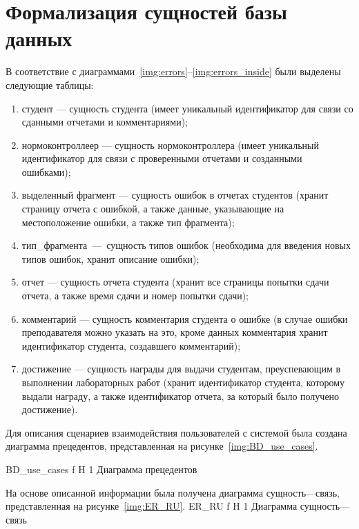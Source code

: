 \section{Формализация сущностей базы данных}

В соответствие с диаграммами~\ref{img:errors}--\ref{img:errors_inside} были выделены следующие таблицы:
\begin{enumerate}
	\item студент --- сущность студента (имеет уникальный идентификатор для связи со сданными отчетами и комментариями);
	\item нормоконтроллеер --- сущность нормоконтроллера (имеет уникальный идентификатор для связи с проверенными отчетами и созданными ошибками);
	\item выделенный фрагмент --- сущность ошибок в отчетах студентов (хранит страницу отчета с ошибкой, а также данные, указывающие на местоположение ошибки, а также тип фрагмента);
	\item тип\_фрагмента~---~сущность типов ошибок (необходима для введения новых типов ошибок, хранит описание ошибки);
	\item отчет --- сущность отчета студента (хранит все страницы попытки сдачи отчета, а также время сдачи и номер попытки сдачи);
	\item комментарий --- сущность комментария студента о ошибке (в случае ошибки преподавателя можно указать на это, кроме данных комментария хранит идентификатор студента, создавшего комментарий);
	\item достижение --- сущность награды для выдачи студентам, преуспевающим в выполнении лабораторных работ (хранит идентификатор студента, которому выдали награду, а также идентификатор отчета, за который было получено достижение).
\end{enumerate}

Для описания сценариев взаимодействия пользователей с системой была создана диаграмма прецедентов, представленная на рисунке~\ref{img:BD_use_cases}.

{BD_use_cases} %
{f} %
{H} %
{1\textwidth} %
{Диаграмма прецедентов} %

На основе описанной информации была получена диаграмма сущность---связь, представленная на рисунке~\ref{img:ER_RU}.
{ER_RU} %
{f} %
{H} %
{1\textwidth} %
{Диаграмма сущность---связь} %

